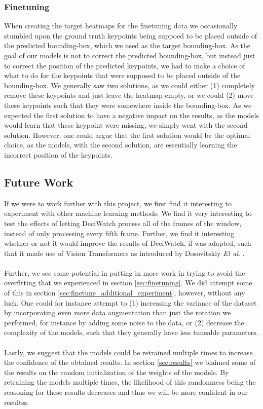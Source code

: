 \documentclass[./main.tex]{subfiles}
\begin{document}
\subsubsection{Finetuning}
When creating the target heatmaps for the finetuning data we occasionally stumbled upon the ground truth keypoints being suppoed to be placed outside of the predicted bounding-box, which we used as the target bounding-box. As the goal of our models is not to correct the predicted bounding-box, but instead just to correct the position of the predicted keypoints, we had to make a choice of what to do for the keypoints that were supposed to be placed outside of the bounding-box. We generally saw two solutions, as we could either (1) completely remove these keypoints and just leave the heatmap empty, or we could (2) move these keypoints such that they were somewhere inside the bounding-box. As we expected the first solution to have a negative impact on the results, as the models would learn that these keypoint were missing, we simply went with the second solution. However, one could argue that the first solution would be the optimal choice, as the models, with the second solution, are essentially learning the incorrect position of the keypoints.


\subsection{Future Work}
\label{sec:future_work}
If we were to work further with this project, we first find it interesting to experiment with other machine learning methods. We find it very interesting to test the effects of letting DeciWatch process all of the frames of the window, instead of only processing every fifth frame. Further, we find it interesting whether or not it would improve the results of DeciWatch, if was adapted, such that it made use of Vision Transformers as introduced by Dosovitskiy \textit{Et al}. \cite{dosovitskiy2021image}.
\\
\\
Further, we see some potential in putting in more work in trying to avoid the overfitting that we experienced in section \ref{sec:finetuning}. We did attempt some of this in section \ref{sec:finetune_additional_experiment}, however, without any luck. One could for instance attempt to (1) increasing the variance of the dataset by incorporating even more data augmentation than just the rotation we performed, for instance by adding some noise to the data, or (2) decrease the complexity of the models, such that they generally have less tuneable parameters.
\\
\\
Lastly, we suggest that the models could be retrained multiple times to increase the confidence of the obtained results. In section \ref{sec:results} we blaimed some of the results on the random initialization of the weights of the models. By retraining the models multiple times, the likelihood of this randomness being the reasoning for these results decreases and thus we will be more confident in our resultss.
\end{document}
